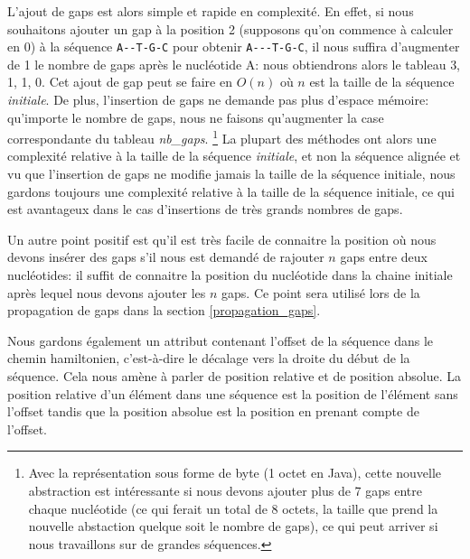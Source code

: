 L'ajout de gaps est alors simple et rapide en complexité. En effet,
si nous souhaitons ajouter un gap à la position 2 (supposons qu'on commence à
calculer en 0) à la séquence \verb|A--T-G-C| pour obtenir \verb|A---T-G-C|, il
nous suffira d'augmenter de 1 le nombre de gaps après le nucléotide A: nous
obtiendrons alors le tableau {3, 1, 1, 0}. Cet ajout de gap peut se faire en
$O(n)$ où $n$ est la taille de la séquence \textit{initiale}. De plus,
l'insertion de gaps ne demande pas plus d'espace mémoire: qu'importe le nombre
de gaps, nous ne faisons qu'augmenter la case
correspondante du tableau \emph{nb\_gaps}. \footnote{Avec la représentation sous
	forme de byte (1 octet en Java), cette nouvelle abstraction est intéressante
si nous devons ajouter plus de 7 gaps entre chaque nucléotide (ce qui ferait un
total de 8 octets, la taille que prend la nouvelle abstaction quelque soit le
nombre de gaps), ce qui peut
arriver si nous travaillons sur de grandes séquences.} La plupart des méthodes
ont alors une complexité relative à la taille de la
séquence \textit{initiale}, et non la séquence alignée et vu que l'insertion de
gaps ne modifie jamais la taille de la séquence initiale, nous
gardons toujours une complexité relative à la taille de la séquence initiale, ce
qui est avantageux dans le cas d'insertions de très grands nombres de gaps.

Un autre point positif est qu'il est très facile de connaitre la position où nous
devons insérer des gaps s'il nous est demandé de rajouter $n$ gaps entre deux
nucléotides: il suffit de connaitre la position du nucléotide dans la chaine
initiale après lequel nous devons ajouter les $n$ gaps. Ce point sera utilisé
lors de la propagation de gaps dans la section \ref{propagation_gaps}.

Nous gardons également un attribut contenant l'offset de la séquence dans le
chemin hamiltonien, c'est-à-dire le décalage vers la droite du début de la
séquence. Cela nous amène à parler de position relative et de position absolue.
La position relative d'un élément dans une séquence est la position de l'élément
sans l'offset tandis que la position absolue est la position en prenant compte
de l'offset.

